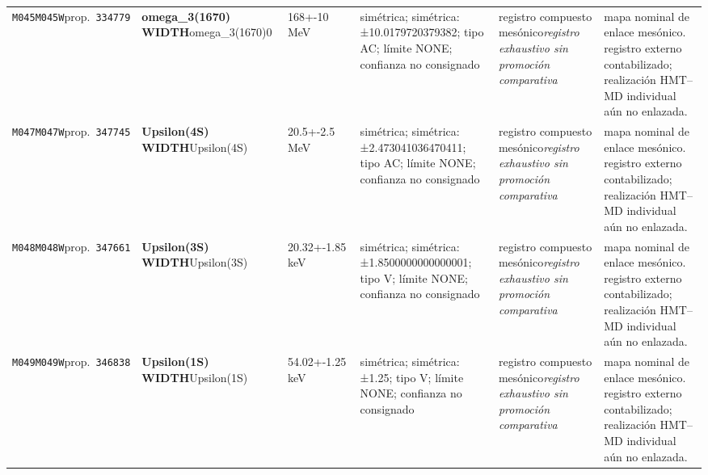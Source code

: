 \begin{landscape}
\begin{longtable}{L{1.85cm}L{4.45cm}L{2.35cm}L{4.05cm}L{3.35cm}L{7.15cm}}
\texttt{M045}\newline \texttt{M045W}\newline prop.\ \texttt{334779} & \textbf{omega\_\allowbreak{}3(1670) WIDTH}\newline omega\_\allowbreak{}3(1670)0 & 168+-10\,MeV & simétrica; simétrica: ±10.0179720379382; tipo AC; límite NONE; confianza no consignado & registro compuesto mesónico\newline \emph{registro exhaustivo sin promoción comparativa} & mapa nominal de enlace mesónico. registro externo contabilizado; realización HMT--MD individual aún no enlazada. \\
\texttt{M047}\newline \texttt{M047W}\newline prop.\ \texttt{347745} & \textbf{Upsilon(4S) WIDTH}\newline Upsilon(4S) & 20.5+-2.5\,MeV & simétrica; simétrica: ±2.473041036470411; tipo AC; límite NONE; confianza no consignado & registro compuesto mesónico\newline \emph{registro exhaustivo sin promoción comparativa} & mapa nominal de enlace mesónico. registro externo contabilizado; realización HMT--MD individual aún no enlazada. \\
\texttt{M048}\newline \texttt{M048W}\newline prop.\ \texttt{347661} & \textbf{Upsilon(3S) WIDTH}\newline Upsilon(3S) & 20.32+-1.85\,keV & simétrica; simétrica: ±1.8500000000000001; tipo V; límite NONE; confianza no consignado & registro compuesto mesónico\newline \emph{registro exhaustivo sin promoción comparativa} & mapa nominal de enlace mesónico. registro externo contabilizado; realización HMT--MD individual aún no enlazada. \\
\texttt{M049}\newline \texttt{M049W}\newline prop.\ \texttt{346838} & \textbf{Upsilon(1S) WIDTH}\newline Upsilon(1S) & 54.02+-1.25\,keV & simétrica; simétrica: ±1.25; tipo V; límite NONE; confianza no consignado & registro compuesto mesónico\newline \emph{registro exhaustivo sin promoción comparativa} & mapa nominal de enlace mesónico. registro externo contabilizado; realización HMT--MD individual aún no enlazada. \\

\end{longtable}
\end{landscape}
